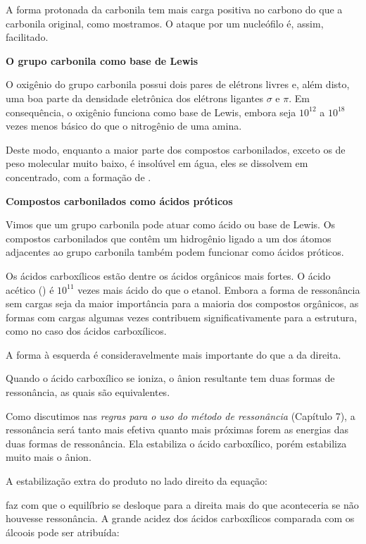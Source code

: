 A forma protonada da carbonila tem mais carga positiva no carbono do que a carbonila original, como mostramos. O ataque por um nucleófilo é, assim, facilitado.

\noindent\textbf{O grupo carbonila como base de Lewis} 

O oxigênio do grupo carbonila possui dois pares de elétrons livres e, além disto, uma boa parte da densidade eletrônica dos elétrons ligantes $\sigma$ e $\pi$. Em consequência, o oxigênio funciona como base de Lewis, embora seja $10^{12}$ a $10^{18}$ vezes menos básico do que o nitrogênio de uma amina. 


Deste modo, enquanto a maior parte dos compostos carbonilados, exceto os de peso molecular muito baixo, é insolúvel em água, eles se dissolvem em  concentrado, com a formação de . 

\noindent\textbf{Compostos carbonilados como ácidos próticos} 

Vimos que um grupo carbonila pode atuar como ácido ou base de Lewis. Os compostos carbonilados que contêm um hidrogênio ligado a um dos átomos adjacentes ao grupo carbonila também podem funcionar como ácidos próticos.



Os ácidos carboxílicos estão dentre os ácidos orgânicos mais fortes. O ácido acético () é $10^{11}$ vezes mais ácido do que o etanol. Embora a forma de ressonância sem cargas seja da maior importância para a maioria dos compostos orgânicos, as formas com cargas algumas vezes contribuem significativamente para a estrutura, como no caso dos ácidos carboxílicos.

A forma à esquerda é consideravelmente mais importante do que a da direita. 

Quando o ácido carboxílico se ioniza, o ânion resultante tem duas formas de ressonância, as quais são equivalentes. 


Como discutimos nas \textit{regras para o uso do método de ressonância} (Capítulo 7), a ressonância será tanto mais efetiva quanto mais próximas forem as energias das duas formas de ressonância. Ela estabiliza o ácido carboxílico, porém estabiliza muito mais o ânion. 

A estabilização extra do produto no lado direito da equação:



\noindent faz com que o equilíbrio se desloque para a direita mais do que aconteceria se não houvesse ressonância. A grande acidez dos ácidos carboxílicos comparada com os álcoois pode ser atribuída:

